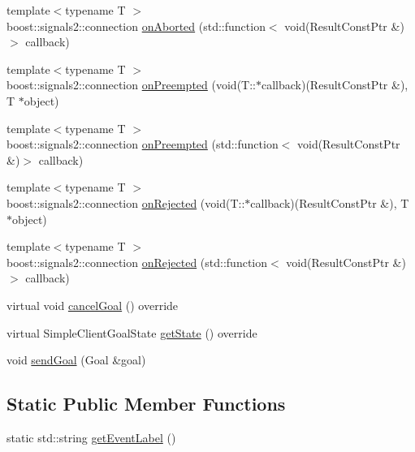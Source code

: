 \begin{DoxyCompactItemize}
\item 
{\footnotesize template$<$typename T $>$ }\\boost\+::signals2\+::connection \hyperlink{classsmacc_1_1client__bases_1_1SmaccActionClientBase_a67661e9415e2f2c2a1fede92a1b3dd1d}{on\+Aborted} (std\+::function$<$ void(Result\+Const\+Ptr \&)$>$ callback)
\item 
{\footnotesize template$<$typename T $>$ }\\boost\+::signals2\+::connection \hyperlink{classsmacc_1_1client__bases_1_1SmaccActionClientBase_a7b11af8b2fe1cf75dead6c3a90baefe2}{on\+Preempted} (void(T\+::$\ast$callback)(Result\+Const\+Ptr \&), T $\ast$object)
\item 
{\footnotesize template$<$typename T $>$ }\\boost\+::signals2\+::connection \hyperlink{classsmacc_1_1client__bases_1_1SmaccActionClientBase_a2941fe4e9a24a7862fd1cfbc63cbfcfa}{on\+Preempted} (std\+::function$<$ void(Result\+Const\+Ptr \&)$>$ callback)
\item 
{\footnotesize template$<$typename T $>$ }\\boost\+::signals2\+::connection \hyperlink{classsmacc_1_1client__bases_1_1SmaccActionClientBase_a4a0f2dc95e6fbc7f25821f57e23b7905}{on\+Rejected} (void(T\+::$\ast$callback)(Result\+Const\+Ptr \&), T $\ast$object)
\item 
{\footnotesize template$<$typename T $>$ }\\boost\+::signals2\+::connection \hyperlink{classsmacc_1_1client__bases_1_1SmaccActionClientBase_af6f191d1b1612d57082aa278db1f7be4}{on\+Rejected} (std\+::function$<$ void(Result\+Const\+Ptr \&)$>$ callback)
\item 
virtual void \hyperlink{classsmacc_1_1client__bases_1_1SmaccActionClientBase_aedeaf9704b73bf05b5522f7250416c9a}{cancel\+Goal} () override
\item 
virtual Simple\+Client\+Goal\+State \hyperlink{classsmacc_1_1client__bases_1_1SmaccActionClientBase_a97192acd7bb7cac5de0191e700ab72ee}{get\+State} () override
\item 
void \hyperlink{classsmacc_1_1client__bases_1_1SmaccActionClientBase_a9c47a5094ac8afb01680307fe5eca922}{send\+Goal} (Goal \&goal)
\end{DoxyCompactItemize}
\subsection*{Static Public Member Functions}
\begin{DoxyCompactItemize}
\item 
static std\+::string \hyperlink{classsmacc_1_1client__bases_1_1SmaccActionClientBase_a283e68df89e8f40d2f3251cbdbff1430}{get\+Event\+Label} ()
\end{DoxyCompactItemize}
